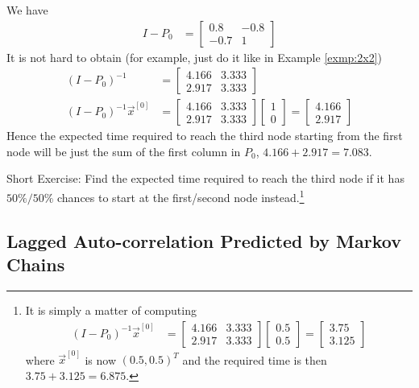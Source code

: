 \begin{solution}
We have
\begin{align*}
I - P_0 &= 
\begin{bmatrix}
0.8 & -0.8\\
-0.7 & 1 
\end{bmatrix} 
\end{align*}
It is not hard to obtain (for example, just do it like in Example \ref{exmp:2x2})
\begin{align*}
(I - P_0)^{-1} &= 
\begin{bmatrix}
4.166 & 3.333 \\
2.917 & 3.333
\end{bmatrix} \\
(I - P_0)^{-1}\vec{x}^{[0]} &= 
\begin{bmatrix}
4.166 & 3.333 \\
2.917 & 3.333
\end{bmatrix}
\begin{bmatrix}
1 \\
0
\end{bmatrix} 
=
\begin{bmatrix}
4.166 \\
2.917
\end{bmatrix}
\end{align*}
Hence the expected time required to reach the third node starting from the first node will be just the sum of the first column in $P_0$, $4.166 + 2.917 = 7.083$.
\end{solution}
Short Exercise: Find the expected time required to reach the third node if it has $50\%/50\%$ chances to start at the first/second node instead.\footnote{It is simply a matter of computing
\begin{align*}
(I - P_0)^{-1}\vec{x}^{[0]} &= 
\begin{bmatrix}
4.166 & 3.333 \\
2.917 & 3.333
\end{bmatrix}
\begin{bmatrix}
0.5 \\
0.5
\end{bmatrix}=
\begin{bmatrix}
3.75 \\
3.125
\end{bmatrix}
\end{align*}
where $\vec{x}^{[0]}$ is now $(0.5, 0.5)^T$ and the required time is then $3.75 + 3.125 = 6.875$.}

\subsection{Lagged Auto-correlation Predicted by Markov Chains}

